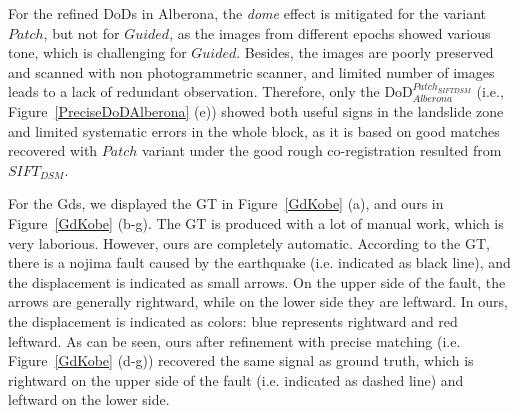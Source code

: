 For the refined \ac{DoD}s in Alberona, the \textit{dome} effect is mitigated for the variant $Patch$, but not for $Guided$, as the images from different epochs showed various tone, which is challenging for $Guided$. Besides, the images are poorly preserved and scanned with non photogrammetric scanner, and limited number of images leads to a lack of redundant observation. Therefore, only the \ac{DoD}$_{Alberona}^{Patch_{SIFTDSM}}$ (i.e., Figure~\ref{PreciseDoDAlberona} (e)) showed both useful signs in the landslide zone and limited systematic errors in the whole block, as it is based on good matches recovered with $Patch$ variant under the good rough co-registration resulted from $SIFT_{DSM}$.\\
\par
For the Gds, we displayed the \ac{GT} in Figure~\ref{GdKobe} (a), and ours in Figure~\ref{GdKobe} (b-g). The \ac{GT} is produced with a lot of manual work, which is very laborious. However, ours are completely automatic. According to the \ac{GT}, there is a nojima fault caused by the earthquake (i.e. indicated as black line), and the displacement is indicated as small arrows. On the upper side of the fault, the arrows are generally rightward, while on the lower side they are leftward. In ours, the displacement is indicated as colors: blue represents rightward and red leftward. As can be seen, ours after refinement with precise matching (i.e. Figure~\ref{GdKobe} (d-g)) recovered the same signal as ground truth, which is rightward on the upper side of the fault (i.e. indicated as dashed line) and leftward on the lower side.



